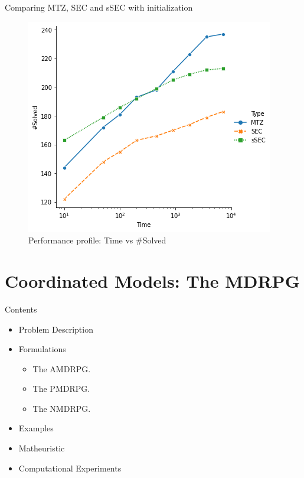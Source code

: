 \documentclass[slidestop,usepdftitle=false,10pt]{beamer}
\begin{document}
    \begin{frame}{Comparing MTZ, SEC and sSEC with initialization}
         \begin{figure}[h!]
          \centering
          \includegraphics[width=0.5\linewidth]{instances_solved.png}
          \caption{Performance profile: Time vs \#Solved}
          \label{fig:profile}
         \end{figure}
    \end{frame}
	
	\section{Coordinated Models: The MDRPG}
	\begin{frame}{Contents}
	    \begin{itemize}
		    \item Problem Description
		    \item Formulations
		    \begin{itemize}
		        \item The AMDRPG.
		        \item The PMDRPG.
		        \item The NMDRPG.
		    \end{itemize}
		    \item Examples
		    \item Matheuristic
		    \item Computational Experiments
		\end{itemize}
	\end{frame}
	
\end{document}
